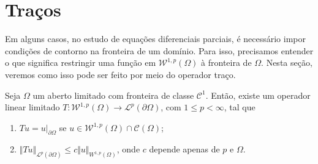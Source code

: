 \documentclass[a4paper, 11pt]{book}
\theoremstyle{definition}
\newcommand{\cC}{\mathcal{C}}
\newcommand{\cL}{\mathcal{L}}
\newcommand{\cW}{\mathcal{W}}
\begin{document}
\section{Traços}

Em alguns casos, no estudo de equações diferenciais parciais, é necessário impor condições de contorno na fronteira de um domínio. Para isso, precisamos entender o que significa restringir uma função em $\cW^{1,p}(\Omega)$ à fronteira de $\Omega$. Nesta seção, veremos como isso pode ser feito por meio do operador traço.

\begin{tbox}
    Seja $\Omega$ um aberto limitado com fronteira de classe $\cC^1$. Então, existe um operador linear limitado $T : \cW^{1,p}(\Omega) \to \cL^p(\partial \Omega)$, com $1 \leqslant p < \infty$, tal que
    \begin{enumerate}[leftmargin=*, label=\textbf{(\alph*)}]
        \item $Tu = u \big|_{\partial \Omega}$ se $u \in \cW^{1,p}(\Omega) \cap \cC(\Omega)$;
        \item $\Vert Tu \Vert_{\cL^p(\partial\Omega)} \leqslant c \Vert u \Vert_{W^{1,p}(\Omega)}$, onde $c$ depende apenas de $p$ e $\Omega$.
    \end{enumerate}
\end{tbox} 
\end{document}
